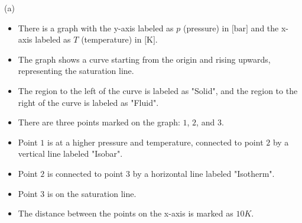 (a)

\begin{itemize}
    \item There is a graph with the y-axis labeled as $p$ (pressure) in $\text{[bar]}$ and the x-axis labeled as $T$ (temperature) in $\text{[K]}$. 
    \item The graph shows a curve starting from the origin and rising upwards, representing the saturation line.
    \item The region to the left of the curve is labeled as "Solid", and the region to the right of the curve is labeled as "Fluid".
    \item There are three points marked on the graph: $1$, $2$, and $3$.
    \item Point $1$ is at a higher pressure and temperature, connected to point $2$ by a vertical line labeled "Isobar".
    \item Point $2$ is connected to point $3$ by a horizontal line labeled "Isotherm".
    \item Point $3$ is on the saturation line.
    \item The distance between the points on the x-axis is marked as $10K$.
\end{itemize}